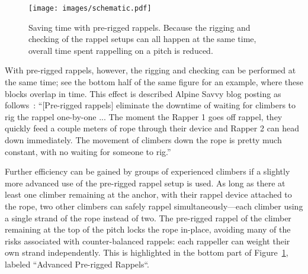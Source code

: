 \documentclass[nonacm,acmtog]{acmart}
\begin{document}
  \begin{figure}
   \texttt{[image: images/schematic.pdf]}
   \caption{Saving time with pre-rigged rappels.  Because the rigging and
   checking of the rappel setups can all happen at the same time, overall time
   spent rappelling on a pitch is reduced.}
   \label{fig:schematic}
  \end{figure}

  With pre-rigged rappels, however, the rigging and checking can be performed
  at the same time; see the bottom half of the same figure for an example,
  where these blocks overlap in time.  This effect is described Alpine Savvy
  blog posting as follows~\cite{alpinesavvy:pre-rigged-rappels}: ``[Pre-rigged
  rappels] eliminate the downtime of waiting for climbers to rig the rappel
  one-by-one ...  The moment the Rapper 1 goes off rappel, they quickly feed a
  couple meters of rope through their device and Rapper 2 can head down
  immediately. The movement of climbers down the rope is pretty much constant,
  with no waiting for someone to rig.''



  Further efficiency can be gained by groups of experienced climbers if a
  slightly more advanced use of the pre-rigged rappel setup is used.  As long
  as there at least one climber remaining at the anchor, with their rappel device
  attached to the rope, two other climbers can safely rappel
  simultaneously---each climber using a single strand of the rope instead of
  two.  The pre-rigged rappel of the climber remaining at the top of the pitch
  locks the rope in-place, avoiding many of the risks associated with
  counter-balanced rappels: each rappeller can weight their own strand
  independently.  This is highlighted in the bottom part of
  Figure~\ref{fig:schematic}, labeled ``Advanced Pre-rigged Rappels``.
\end{document}
